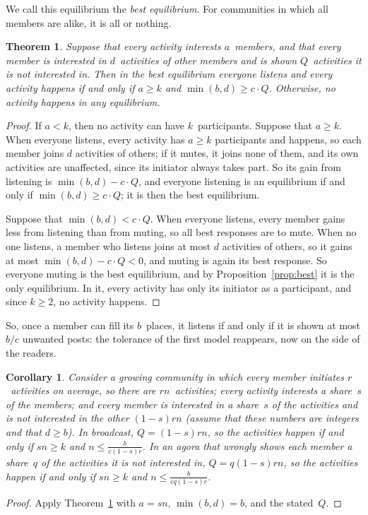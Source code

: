 \documentclass[11pt]{article}
\newtheorem{theorem}{Theorem}
\newtheorem{corollary}{Corollary}
\theoremstyle{definition}
\begin{document}
We call this equilibrium the \emph{best equilibrium}. For communities in which all members are alike, it is all or nothing.

\begin{theorem}\label{thm:game}
Suppose that every activity interests $a$~members, and that every member is interested in $d$~activities of other members and is shown $Q$~activities it is not interested in. Then in the best equilibrium everyone listens and every activity happens if and only if $a \ge k$ and $\min(b, d) \ge c \cdot Q$. Otherwise, no activity happens in any equilibrium.
\end{theorem}
\begin{proof}
If $a < k$, then no activity can have $k$~participants. Suppose that $a \ge k$. When everyone listens, every activity has $a \ge k$ participants and happens, so each member joins $d$ activities of others; if it mutes, it joins none of them, and its own activities are unaffected, since its initiator always takes part. So its gain from listening is $\min(b, d) - c \cdot Q$, and everyone listening is an equilibrium if and only if $\min(b, d) \ge c \cdot Q$; it is then the best equilibrium.

Suppose that $\min(b,d) < c \cdot Q$. When everyone listens, every member gains less from listening than from muting, so all best responses are to mute. When no one listens, a member who listens joins at most $d$ activities of others, so it gains at most $\min(b,d) - c\cdot Q < 0$, and muting is again its best response. So everyone muting is the best equilibrium, and by Proposition~\ref{prop:best} it is the only equilibrium. In it, every activity has only its initiator as a participant, and since $k \ge 2$, no activity happens.
\end{proof}

So, once a member can fill its $b$~places, it listens if and only if it is shown at most $b/c$ unwanted posts: the tolerance of the first model reappears, now on the side of the readers.

\begin{corollary}\label{cor:game}
Consider a growing community in which every member initiates $r$~activities on average, so there are $rn$~activities; every activity interests a share~$s$ of the members; and every member is interested in a share~$s$ of the activities and is not interested in the other $(1-s)rn$ (assume that these numbers are integers and that $d \ge b$). In broadcast, $Q = (1-s)rn$, so the activities happen if and only if $sn \ge k$ and $n \le \frac{b}{c(1-s)r}$. In an agora that wrongly shows each member a share~$q$ of the activities it is not interested in, $Q = q(1-s)rn$, so the activities happen if and only if $sn \ge k$ and $n \le \frac{b}{cq(1-s)r}$.
\end{corollary}
\begin{proof}
Apply Theorem~\ref{thm:game} with $a = sn$, $\min(b,d) = b$, and the stated~$Q$.
\end{proof}
\end{document}
